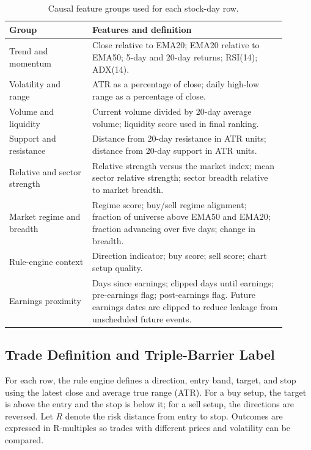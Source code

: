 \documentclass[11pt]{article}
\begin{document}
\begin{table}[ht]
\centering
\small
\caption{Causal feature groups used for each stock-day row.}
\label{tab:features}
\begin{tabular}{p{0.27\linewidth} p{0.63\linewidth}}
\toprule
\textbf{Group} & \textbf{Features and definition} \\
\midrule
Trend and momentum &
Close relative to EMA20; EMA20 relative to EMA50; 5-day and 20-day returns;
RSI(14); ADX(14). \\
\addlinespace
Volatility and range &
ATR as a percentage of close; daily high-low range as a percentage of close. \\
\addlinespace
Volume and liquidity &
Current volume divided by 20-day average volume; liquidity score used in final
ranking. \\
\addlinespace
Support and resistance &
Distance from 20-day resistance in ATR units; distance from 20-day support in
ATR units. \\
\addlinespace
Relative and sector strength &
Relative strength versus the market index; mean sector relative strength;
sector breadth relative to market breadth. \\
\addlinespace
Market regime and breadth &
Regime score; buy/sell regime alignment; fraction of universe above EMA50 and
EMA20; fraction advancing over five days; change in breadth. \\
\addlinespace
Rule-engine context &
Direction indicator; buy score; sell score; chart setup quality. \\
\addlinespace
Earnings proximity &
Days since earnings; clipped days until earnings; pre-earnings flag;
post-earnings flag. Future earnings dates are clipped to reduce leakage from
unscheduled future events. \\
\bottomrule
\end{tabular}
\end{table}

\subsection{Trade Definition and Triple-Barrier Label}

For each row, the rule engine defines a direction, entry band, target, and stop
using the latest close and average true range (ATR). For a buy setup, the target
is above the entry and the stop is below it; for a sell setup, the directions
are reversed. Let $R$ denote the risk distance from entry to stop. Outcomes are
expressed in R-multiples so trades with different prices and volatility can be
compared.
\end{document}
